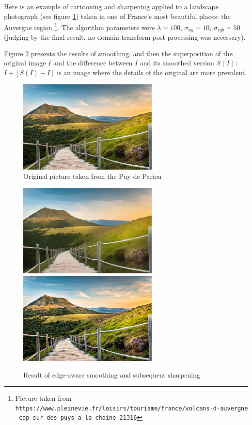 \documentclass{article}
\begin{document}
\medskip

Here is an example of cartooning and sharpening applied to a landscape photograph (see figure \ref{fig:auvergne_original}) taken in one of France's most beautiful places: the Auvergne region \footnote{Picture taken from \texttt{https://www.pleinevie.fr/loisirs/tourisme/france/volcans-d-auvergne\\-cap-sur-des-puys-a-la-chaine-21316}}. The algorithm parameters were $\lambda = 100$, $\sigma_{xy} = 10$, $\sigma_{rgb} = 50$ (judging by the final result, no domain transform post-processing was necessary).

Figure \ref{fig:auvergne} presents the results of smoothing, and then the superposition of the original image $I$ and the difference between $I$ and its smoothed version $S(I)$: $I + [S(I) - I]$ is an image where the details of the original are more prevalent.

\begin{figure}
    \centering
    \includegraphics[width=7cm]{pictures/smoothing_auvergne_ref.png}
    \caption{Original picture taken from the Puy de Pariou}
    \label{fig:auvergne_original}
\end{figure}

\begin{figure}
    \centering
    \includegraphics[width=7cm]{pictures/smoothing_auvergne_new.png}
    \includegraphics[width=7cm]{pictures/smoothing_auvergne_sharp.png}
    \caption{Result of edge-aware smoothing and subsequent sharpening}
    \label{fig:auvergne}
\end{figure}
\end{document}
